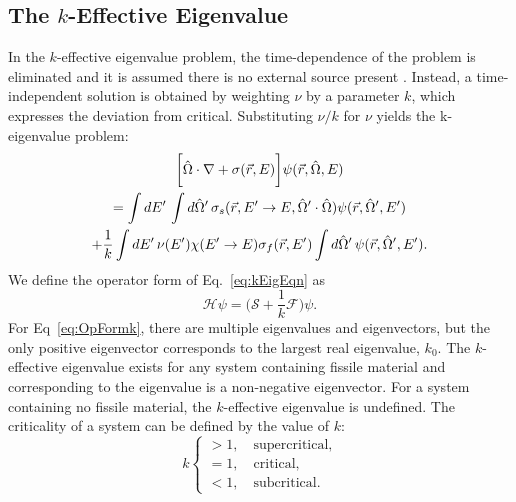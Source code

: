 \subsection{The $k$-Effective Eigenvalue}
\label{subsec:k}

In the $k$-effective eigenvalue problem, the time-dependence of the problem is eliminated and it is assumed there is no external source present \cite{bell_nuclear_1970}. Instead, a time-independent solution is obtained by weighting $\nu$ by a parameter $k$, which expresses the deviation from critical. Substituting $\nu/k$ for $\nu$ yields the k-eigenvalue problem: 
\begin{multline}
	\bigg [ \hat{\Omega} \cdot \nabla + \sigma(\vec{r},E) \bigg ] \psi(\vec{r},\hat{\Omega},E) \\ = \int \mathop{}\!d E' \, \int \mathop{}\!d \hat{\Omega}' \, \sigma_{s}(\vec{r},E'\rightarrow E,\hat{\Omega}' \cdot \hat{\Omega}) \psi(\vec{r},\hat{\Omega}',E') \\ + \frac{1}{k} \int \mathop{}\!d E' \, \nu(E') \chi(E'\rightarrow E) \sigma_{f}(\vec{r},E') \int \mathop{}\!d \hat{\Omega}' \, \psi(\vec{r},\hat{\Omega}',E').
	\label{eq:kEigEqn}
\end{multline}
We define the operator form of Eq.~\ref{eq:kEigEqn} as
\begin{equation}
\mathcal{H} \psi = \bigg ( \mathcal{S} + \frac{1}{k}\mathcal{F} \bigg ) \psi.
\label{eq:OpFormk}
\end{equation}
For Eq~\ref{eq:OpFormk}, there are multiple eigenvalues and eigenvectors, but the only positive eigenvector corresponds to the largest real eigenvalue, $k_{0}$. The $k$-effective eigenvalue exists for any system containing fissile material and corresponding to the eigenvalue is a non-negative eigenvector. For a system containing no fissile material, the $k$-effective eigenvalue is undefined. The criticality of a system can be defined by the value of $k$:
	$$ k \begin{cases}						  			  			 > 1, \quad \text{supercritical,} \\			 			 			= 1, \quad \text{critical,} \\
					 < 1, \quad \text{subcritical.} 				       \end{cases} $$

